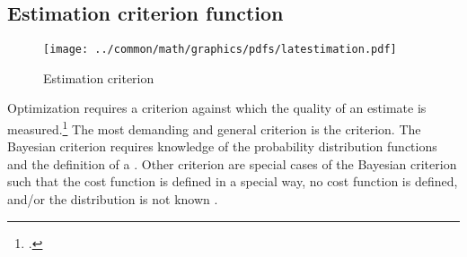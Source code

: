 \subsection{Estimation criterion function}
\label{sec:est_criterion}
\begin{figure}
\centering%
\texttt{[image: ../common/math/graphics/pdfs/latestimation.pdf]}
\caption{
   Estimation criterion
   \label{fig:est-criterion}
   }
\end{figure}

Optimization requires a criterion against which the quality of an
estimate is measured.\footnote{.}
The most demanding and general criterion is the  criterion.
The Bayesian criterion requires knowledge of the probability
distribution functions and the definition of a .
Other criterion are special cases of the Bayesian criterion
such that the cost function is defined in a special way,
no cost function is defined, and/or the distribution is not known
.

